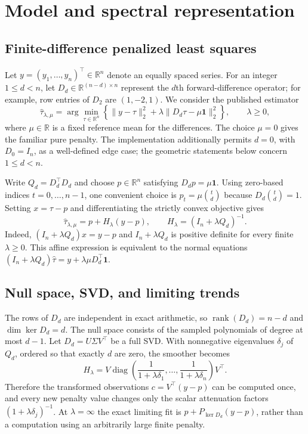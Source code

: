 \documentclass[pdflatex,sn-mathphys-ay]{sn-jnl}
\newcommand{\R}{\mathbb{R}}
\newcommand{\diag}{\operatorname{diag}}
\begin{document}
\section{Model and spectral representation}
\subsection{Finite-difference penalized least squares}
Let $y=(y_1,\ldots,y_n)^\top\in\R^n$ denote an equally spaced series. For an integer $1\le d<n$, let $D_d\in\R^{(n-d)\times n}$ represent the $d$th forward-difference operator; for example, row entries of $D_2$ are $(1,-2,1)$. We consider the published estimator
\begin{equation}\label{eq:objective}
 \widehat\tau_{\lambda,\mu}=\arg\min_{\tau\in\R^n}\left\{\|y-\tau\|_2^2+\lambda\|D_d\tau-\mu\mathbf{1}\|_2^2\right\},\qquad\lambda\ge0,
\end{equation}
where $\mu\in\R$ is a fixed reference mean for the differences. The choice $\mu=0$ gives the familiar pure penalty. The implementation additionally permits $d=0$, with $D_0=I_n$, as a well-defined edge case; the geometric statements below concern $1\le d<n$.

Write $Q_d=D_d^\top D_d$ and choose $p\in\R^n$ satisfying $D_dp=\mu\mathbf1$. Using zero-based indices $t=0,\ldots,n-1$, one convenient choice is $p_t=\mu\binom{t}{d}$ because $D_d\binom{t}{d}=1$. Setting $x=\tau-p$ and differentiating the strictly convex objective gives
\begin{equation}\label{eq:affine}
 \widehat\tau_{\lambda,\mu}=p+H_\lambda(y-p),\qquad H_\lambda=(I_n+\lambda Q_d)^{-1}.
\end{equation}
Indeed, $(I_n+\lambda Q_d)x=y-p$ and $I_n+\lambda Q_d$ is positive definite for every finite $\lambda\ge0$. This affine expression is equivalent to the normal equations $(I_n+\lambda Q_d)\widehat\tau=y+\lambda\mu D_d^\top\mathbf1$.



\subsection{Null space, SVD, and limiting trends}
The rows of $D_d$ are independent in exact arithmetic, so $\operatorname{rank}(D_d)=n-d$ and $\dim\ker D_d=d$. The null space consists of the sampled polynomials of degree at most $d-1$. Let $D_d=U\Sigma V^\top$ be a full SVD. With nonnegative eigenvalues $\delta_j$ of $Q_d$, ordered so that exactly $d$ are zero, the smoother becomes
\begin{equation}\label{eq:spectrum}
H_\lambda=V\diag\!\left(\frac{1}{1+\lambda\delta_1},\ldots,\frac{1}{1+\lambda\delta_n}\right)V^\top.
\end{equation}
Therefore the transformed observations $c=V^\top(y-p)$ can be computed once, and every new penalty value changes only the scalar attenuation factors $(1+\lambda\delta_j)^{-1}$. At $\lambda=\infty$ the exact limiting fit is $p+P_{\ker D_d}(y-p)$, rather than a computation using an arbitrarily large finite penalty.
\end{document}
